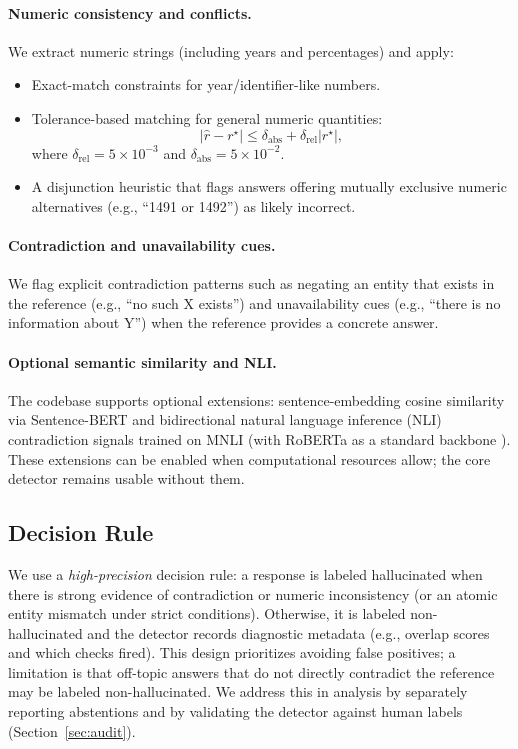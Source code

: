 \documentclass[11pt]{article}
\begin{document}
\paragraph{Numeric consistency and conflicts.}
We extract numeric strings (including years and percentages) and apply:
\begin{itemize}
    \item Exact-match constraints for year/identifier-like numbers.
    \item Tolerance-based matching for general numeric quantities:
    \begin{equation}
    |\hat{r}-r^\star|\le \delta_{\text{abs}}+\delta_{\text{rel}}|r^\star|,
    \end{equation}
    where $\delta_{\text{rel}}=5\times 10^{-3}$ and $\delta_{\text{abs}}=5\times 10^{-2}$.
    \item A disjunction heuristic that flags answers offering mutually exclusive numeric alternatives (e.g., ``1491 or 1492'') as likely incorrect.
\end{itemize}

\paragraph{Contradiction and unavailability cues.}
We flag explicit contradiction patterns such as negating an entity that exists in the reference (e.g., ``no such X exists'') and unavailability cues (e.g., ``there is no information about Y'') when the reference provides a concrete answer.

\paragraph{Optional semantic similarity and NLI.}
The codebase supports optional extensions: sentence-embedding cosine similarity via Sentence-BERT \cite{sentencebert} and bidirectional natural language inference (NLI) contradiction signals trained on MNLI \cite{mnli} (with RoBERTa as a standard backbone \cite{roberta}). These extensions can be enabled when computational resources allow; the core detector remains usable without them.

\subsection{Decision Rule}
We use a \emph{high-precision} decision rule: a response is labeled hallucinated when there is strong evidence of contradiction or numeric inconsistency (or an atomic entity mismatch under strict conditions). Otherwise, it is labeled non-hallucinated and the detector records diagnostic metadata (e.g., overlap scores and which checks fired). This design prioritizes avoiding false positives; a limitation is that off-topic answers that do not directly contradict the reference may be labeled non-hallucinated. We address this in analysis by separately reporting abstentions and by validating the detector against human labels (Section~\ref{sec:audit}).
\end{document}
